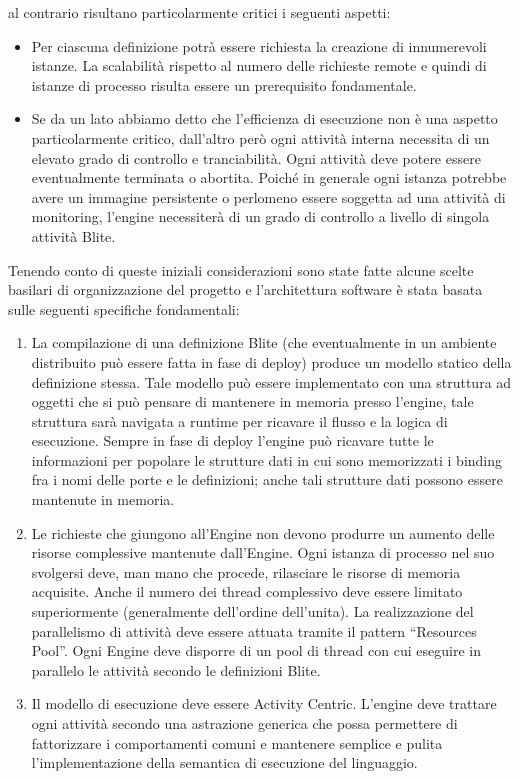 al contrario risultano particolarmente critici i seguenti aspetti:
\begin{itemize}
  \item Per ciascuna definizione potrà essere richiesta la creazione di
  innumerevoli istanze. La scalabilità rispetto al numero delle
  richieste remote e quindi di istanze di processo risulta essere un
  prerequisito fondamentale.
  
  \item Se da un lato abbiamo detto che l'efficienza di esecuzione non \`e 
  una aspetto particolarmente critico, dall'altro per\`o ogni attività interna
  necessita di un elevato grado di controllo e tranciabilità. Ogni attività deve
  potere essere eventualmente terminata o abortita. Poiché in generale
  \footnotetext{} ogni istanza potrebbe avere un immagine persistente o
  perlomeno essere soggetta ad una attività di monitoring, l'engine necessiterà
  di un grado di controllo a livello di singola attività Blite.
\end{itemize}

Tenendo conto di queste iniziali considerazioni sono state fatte alcune scelte
basilari di organizzazione del progetto e l'architettura software \`e stata
basata sulle seguenti specifiche fondamentali:

\begin{enumerate}
  \item La compilazione di una definizione Blite (che eventualmente in un
  ambiente distribuito può essere fatta in fase di deploy) produce un modello
  statico della definizione stessa. Tale modello può essere implementato con una
  struttura ad oggetti che si può pensare di mantenere in memoria presso
  l'engine, tale struttura sarà navigata a runtime per ricavare il
  flusso e la logica di esecuzione. Sempre in fase di deploy l'engine può
  ricavare tutte le informazioni per popolare le strutture dati in cui sono 
  memorizzati i binding fra i nomi delle porte e le definizioni; anche tali
  strutture dati possono essere mantenute in memoria.
  
  \item Le richieste che giungono all'Engine non devono produrre un aumento
  delle risorse complessive mantenute dall'Engine. Ogni istanza di processo nel
  suo svolgersi deve, man mano che procede, rilasciare le risorse di memoria
  acquisite. Anche il numero dei thread complessivo deve essere limitato
  superiormente (generalmente dell'ordine dell'unita). La realizzazione del
  parallelismo di attività deve essere attuata tramite il pattern ``Resources
  Pool''. Ogni Engine deve disporre di un pool di thread con cui eseguire in
  parallelo le attività secondo le definizioni Blite.
  
  \item Il modello di esecuzione deve essere Activity Centric. L'engine deve
  trattare ogni attività secondo una astrazione generica che possa permettere di
  fattorizzare i comportamenti comuni e mantenere semplice e pulita
  l'implementazione della semantica di esecuzione del linguaggio.
\end{enumerate}
 
